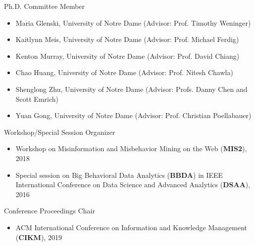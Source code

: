 \documentclass[margin, 9pt]{res}
\begin{document}
\begin{resume}
{Ph.D. Committee Member}
\begin{itemize}
\item Maria Glenski, University of Notre Dame (Advisor: Prof. Timothy Weninger)
\item Kaitlynn Meis, University of Notre Dame (Advisor: Prof. Michael Ferdig)
\item Kenton Murray, University of Notre Dame (Advisor: Prof. David Chiang)	
\item Chao Huang, University of Notre Dame (Advisor: Prof. Nitesh Chawla)
\item Shenglong Zhu, University of Notre Dame (Advisor: Profs. Danny Chen and Scott Emrich)
\item Yuan Gong, University of Notre Dame (Advisor: Prof. Christian Poellabauer)
\end{itemize}
\vspace{-0.1in}

{Workshop/Special Session Organizer}
\begin{itemize}
\item Workshop on Misinformation and Misbehavior Mining on the Web (\textbf{MIS2}), 2018
\item Special session on Big Behavioral Data Analytics (\textbf{BBDA})
	in IEEE International Conference on Data Science and Advanced Analytics (\textbf{DSAA}), 2016
\end{itemize}
\vspace{-0.1in}

{Conference Proceedings Chair}
\begin{itemize}
\item ACM International Conference on Information and Knowledge Management (\textbf{CIKM}), 2019
\end{itemize}
\vspace{-0.1in}


\end{resume}
\end{document}
